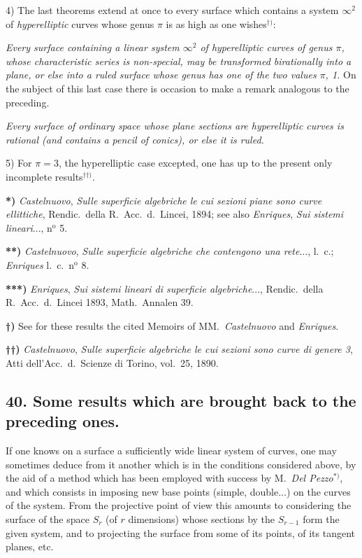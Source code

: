 \documentclass{article}
\begin{document}
4) The last theorems extend at once to every surface which contains a system $\infty^{2}$ of \emph{hyperelliptic} curves whose genus $\pi$ is as high as one wishes${}^{\dagger)}$:

\emph{Every surface containing a linear system $\infty^{2}$ of hyperelliptic curves of genus $\pi$, whose characteristic series is non-special, may be transformed birationally into a plane, or else into a ruled surface whose genus has one of the two values $\pi$, 1.} On the subject of this last case there is occasion to make a remark analogous to the preceding.

\emph{Every surface of ordinary space whose plane sections are hyperelliptic curves is rational (and contains a pencil of conics), or else it is ruled.}

5) For $\pi = 3$, the hyperelliptic case excepted, one has up to the present only incomplete results${}^{\dagger\dagger)}$.

\textbf{*)} \emph{Castelnuovo}, \emph{Sulle superficie algebriche le cui sezioni piane sono curve ellittiche}, Rendic.\ della R.\ Acc.\ d.\ Lincei, 1894; see also \emph{Enriques}, \emph{Sui sistemi lineari}..., n${}^{\text{o}}$ 5.

\textbf{**)} \emph{Castelnuovo}, \emph{Sulle superficie algebriche che contengono una rete}..., l.\ c.; \emph{Enriques} l.\ c.\ n${}^{\text{o}}$ 8.

\textbf{***)} \emph{Enriques}, \emph{Sui sistemi lineari di superficie algebriche}..., Rendic.\ della R.\ Acc.\ d.\ Lincei 1893, Math.\ Annalen 39.

\textbf{†)} See for these results the cited Memoirs of MM.\ \emph{Castelnuovo} and \emph{Enriques}.

\textbf{††)} \emph{Castelnuovo}, \emph{Sulle superficie algebriche le cui sezioni sono curve di genere 3}, Atti dell'Acc.\ d.\ Scienze di Torino, vol.\ 25, 1890.


\subsection*{40. Some results which are brought back to the preceding ones.}

If one knows on a surface a sufficiently wide linear system of curves, one may sometimes deduce from it another which is in the conditions considered above, by the aid of a method which has been employed with success by M.\ \emph{Del Pezzo}${}^{*)}$, and which consists in imposing new base points (simple, double...) on the curves of the system. From the projective point of view this amounts to considering the surface of the space $S_{r}$ (of $r$ dimensions) whose sections by the $S_{r-1}$ form the given system, and to projecting the surface from some of its points, of its tangent planes, etc.
\end{document}
